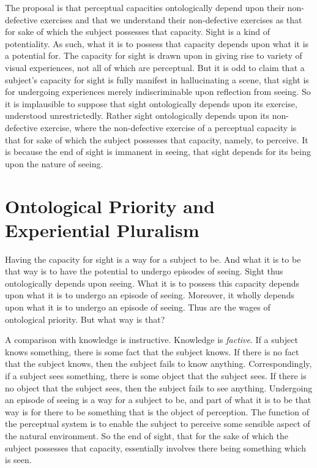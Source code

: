 \documentclass[12pt]{article}
\begin{document}
The proposal is that perceptual capacities ontologically depend upon their non-defective exercises and that we understand their non-defective exercises as that for sake of which the subject possesses that capacity. Sight is a kind of potentiality. As such, what it is to possess that capacity depends upon what it is a potential for. The capacity for sight is drawn upon in giving rise to variety of visual experiences, not all of which are perceptual. But it is odd to claim that a subject's capacity for sight is fully manifest in hallucinating a scene, that sight is for undergoing experiences merely indiscriminable upon reflection from seeing. So it is implausible to suppose that sight ontologically depends upon its exercise, understood unrestrictedly. Rather sight ontologically depends upon its non-defective exercise, where the non-defective exercise of a perceptual capacity is that for sake of which the subject possesses that capacity, namely, to perceive. It is because the end of sight is immanent in seeing, that sight depends for its being upon the nature of seeing.


\section{Ontological Priority and Experiential Pluralism} %
\label{sec:ontological_dependence_and_experiential_pluralism}

Having the capacity for sight is a way for a subject to be. And what it is to be that way is to have the potential to undergo episodes of seeing. Sight thus ontologically depends upon seeing. What it is to possess this capacity depends upon what it is to undergo an episode of seeing. Moreover, it wholly depends upon what it is to undergo an episode of seeing. Thus are the wages of ontological priority. But what way is that?

A comparison with knowledge is instructive. Knowledge is \emph{factive}. If a subject knows something, there is some fact that the subject knows. If there is no fact that the subject knows, then the subject fails to know anything. Correspondingly, if a subject sees something, there is some object that the subject sees. If there is no object that the subject sees, then the subject fails to see anything. Undergoing an episode of seeing is a way for a subject to be, and part of what it is to be that way is for there to be something that is the object of perception. The function of the perceptual system is to enable the subject to perceive some sensible aspect of the natural environment. So the end of sight, that for the sake of which the subject possesses that capacity, essentially involves there being something which is seen.
\end{document}
